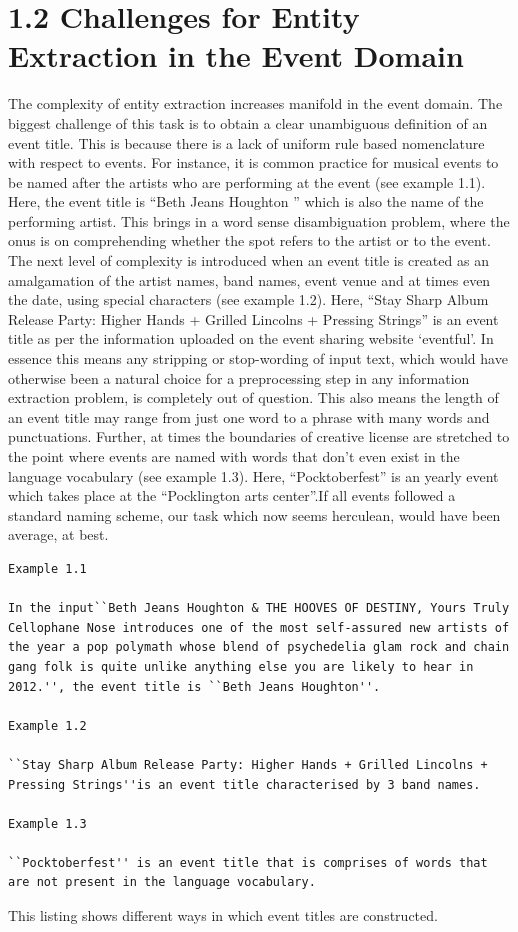 \documentclass[a4paper,11pt]{report}
\begin{document}
\section*{1.2 Challenges for Entity Extraction in the Event Domain}

The complexity of entity extraction increases manifold in the event domain. The biggest challenge of this task is to obtain a clear unambiguous definition of an event title. This is because there is a lack of uniform rule based nomenclature with respect to events. For instance, it is common practice for musical events to be named after the artists who are performing at the event (see example 1.1). Here, the event title is ``Beth Jeans Houghton '' which is also the name of the performing artist. This brings in a word sense disambiguation problem, where the onus is on comprehending whether the spot refers to the artist or to the event. The next level of complexity is introduced when an event title is created as an amalgamation of the artist names, band names, event venue and at times even the date, using special characters (see example 1.2). Here, ``Stay Sharp Album Release Party: Higher Hands + Grilled Lincolns + Pressing Strings'' is an event title as per the information uploaded on the event sharing website `eventful'. In essence this means any stripping or stop-wording of input text, which would have otherwise been a natural choice for a preprocessing step in any information extraction problem, is completely out of question. This also means the length of an event title may range from just one word to a phrase with many words and punctuations. Further, at times the boundaries of creative license are stretched to the point where events are named with words that don’t even exist in the language vocabulary (see example 1.3). Here, ``Pocktoberfest'' is an yearly event which takes place at the ``Pocklington arts center''.If all events followed a standard naming scheme, our task which now seems herculean, would have been average, at best.\newline 

\begin{lstlisting}
Example 1.1

In the input``Beth Jeans Houghton & THE HOOVES OF DESTINY, Yours Truly Cellophane Nose introduces one of the most self-assured new artists of the year a pop polymath whose blend of psychedelia glam rock and chain gang folk is quite unlike anything else you are likely to hear in 2012.'', the event title is ``Beth Jeans Houghton''.

Example 1.2

``Stay Sharp Album Release Party: Higher Hands + Grilled Lincolns + Pressing Strings''is an event title characterised by 3 band names.

Example 1.3

``Pocktoberfest'' is an event title that is comprises of words that are not present in the language vocabulary.
\end{lstlisting}
This listing shows different ways in which event titles are constructed. \newline \newline
\end{document}
